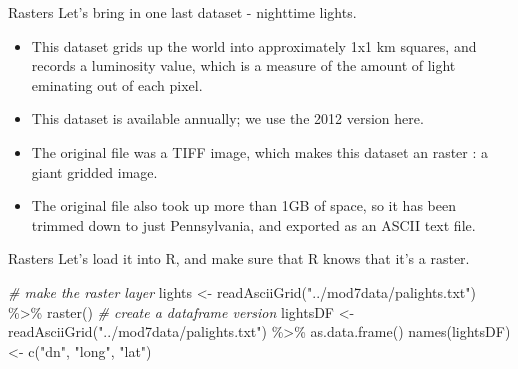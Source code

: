 \documentclass[
  ignorenonframetext,
]{beamer}
\newenvironment{Shaded}{\begin{snugshade}}{\end{snugshade}}
\newcommand{\CommentTok}[1]{\textcolor[rgb]{0.56,0.35,0.01}{\textit{#1}}}
\newcommand{\FunctionTok}[1]{\textcolor[rgb]{0.00,0.00,0.00}{#1}}
\newcommand{\NormalTok}[1]{#1}
\newcommand{\OtherTok}[1]{\textcolor[rgb]{0.56,0.35,0.01}{#1}}
\newcommand{\SpecialCharTok}[1]{\textcolor[rgb]{0.00,0.00,0.00}{#1}}
\newcommand{\StringTok}[1]{\textcolor[rgb]{0.31,0.60,0.02}{#1}}
\begin{document}
\begin{frame}{Rasters}
\protect\hypertarget{rasters}{}
Let's bring in one last dataset - nighttime lights.

\begin{itemize}
\item
  This dataset grids up the world into approximately 1x1 km squares, and
  records a luminosity value, which is a measure of the amount of light
  eminating out of each pixel.
\item
  This dataset is available annually; we use the 2012 version here.
\item
  The original file was a TIFF image, which makes this dataset an raster
  : a giant gridded image.
\item
  The original file also took up more than 1GB of space, so it has been
  trimmed down to just Pennsylvania, and exported as an ASCII text file.
\end{itemize}
\end{frame}

\begin{frame}[fragile]{Rasters}
\protect\hypertarget{rasters-1}{}
Let's load it into R, and make sure that R knows that it's a raster.
\tiny

\begin{Shaded}
\begin{Highlighting}[]
\CommentTok{\# make the raster layer}
\NormalTok{lights }\OtherTok{\textless{}{-}} \FunctionTok{readAsciiGrid}\NormalTok{(}\StringTok{"../mod7data/palights.txt"}\NormalTok{) }\SpecialCharTok{\%\textgreater{}\%}
      \FunctionTok{raster}\NormalTok{()}
\CommentTok{\# create a dataframe version}
\NormalTok{lightsDF }\OtherTok{\textless{}{-}} \FunctionTok{readAsciiGrid}\NormalTok{(}\StringTok{"../mod7data/palights.txt"}\NormalTok{) }\SpecialCharTok{\%\textgreater{}\%}
      \FunctionTok{as.data.frame}\NormalTok{()}
\FunctionTok{names}\NormalTok{(lightsDF) }\OtherTok{\textless{}{-}} \FunctionTok{c}\NormalTok{(}\StringTok{"dn"}\NormalTok{, }\StringTok{"long"}\NormalTok{, }\StringTok{"lat"}\NormalTok{)}
\end{Highlighting}
\end{Shaded}
\end{frame}
\end{document}
